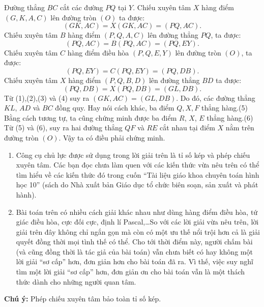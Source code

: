 \begin{bt}
{Đường thẳng $ BC $ cắt các đường $ PQ $ tại $ Y $.
Chiếu xuyên tâm $ X $ hàng điểm $ (G,K,A,C) $ lên đường tròn $ (O) $ ta được: 
\[(GK,AC)=X(GK,AC)=(PQ,AC).\tag{1}\]
Chiếu xuyên tâm $ B $ hàng điểm $ (P,Q,A,C) $ lên đường thẳng $ PQ $, ta được:
\[(PQ, AC) =B(PQ,AC) = (PQ,EY).\tag{2}\]
Chiếu xuyên tâm $ C $ hàng điểm điều hòa $ (P,Q,E,Y) $ lên đường tròn $ (O) $, ta được:
\[(PQ,EY) =C(PQ,EY)=(PQ,DB).\tag{3}\]
Chiếu xuyên tâm $ X $ hàng điểm $ (P,Q,B,D) $ lên đường thẳng $ BD $ ta được:
\[(PQ, DB) = X(PQ,DB)=(GL,DB).\tag{4}\]
Từ (1),(2),(3) và (4) suy ra
$ (GK,AC) = (GL,DB). $
Do đó, các đường thẳng $ KL$, $AD $ và $ BC $ đồng quy.
Hay nói cách khác, ba điểm $ Q, X,F $ thẳng hàng.\hfill(5)\\
Bằng cách tương tự, ta cũng chứng minh được ba điểm $ R $, $ X $, $ E $ thẳng hàng.\hfill(6)\\
Từ (5) và (6), suy ra hai đường thẳng $ QF $ và $ RE $ cắt nhau tại điểm $ X $ nằm trên đường tròn $ (O) $.
Vậy ta có điều phải chứng minh.
	\begin{nx}
			\noindent 
	\begin{enumerate}
	\item Công cụ chủ lực được sử dụng trong lời giải trên là tỉ số kép và phép chiếu xuyên tâm. Các bạn đọc chưa làm quen với các kiến thức vừa nêu trên có thể tìm hiểu về các kiến thức đó trong cuốn ``Tài liệu giáo khoa chuyên toán hình học 10'' (sách do Nhà xuất bản Giáo dục tổ chức biên soạn, sản xuất và phát hành).
		\item Bài toán trên có nhiều cách giải khác nhau như dùng hàng điểm điều hòa, tứ giác điều hòa, cực đối cực, định lí Pascal,\ldots So với các lời giải vừa nêu trên, lời giải trên đây không chỉ ngắn gọn mà còn có một ưu thế nổi trội hơn cả là giải quyết đồng thời mọi tình thế có thể. Cho tới thời điểm này, người chấm bài (và cũng đồng thời là tác giả của bài toán) vẫn chưa biết có hay không một lời giải ``sơ cấp'' hơn, đơn giản hơn cho bài toán đã ra. Vì thế, việc suy nghĩ tìm một lời giải  ``sơ cấp'' hơn, đơn giản ơn cho bài toán vẫn là một thách thức dành cho những người quan tâm.
	\end{enumerate}
	\end{nx}	
\textbf{Chú ý: }Phép chiếu xuyên tâm bảo toàn tỉ số kép.		
}
\end{bt}	
		
